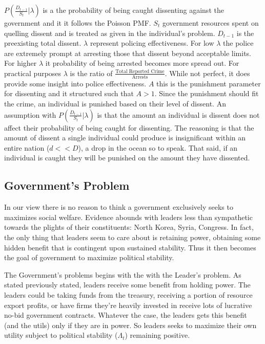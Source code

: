 \documentclass[12pt]{article}
\begin{document}
\begin{spacing}{1.5}
$P \left(\frac{D_{t-1}}{S_t}\Big|\lambda \right)$ is a the probability of being caught dissenting against the government and it it follows the Poisson PMF. $S_t$ government resources spent on quelling dissent and is treated as given in the individual's problem. $D_{t-1}$ is the preexisting total dissent. $\lambda$ represent policing effectiveness. For low $\lambda$ the police are extremely prompt at arresting those that dissent beyond acceptable limits. For higher $\lambda$ it probability of being arrested becomes more spread out. For practical purposes $\lambda$ is the ratio of $\frac{\text{Total Reported Crime}}{\text{Arrests}}$. While not perfect, it does provide some insight into police effectiveness. $A$ this is the punishment parameter for dissenting and it structured such that $A>1$. Since the punishment should fit the crime, an individual is punished based on their level of dissent. An assumption with $P \left(\frac{D_{t-1}}{S_t}\Big|\lambda \right)$ is that the amount an individual is dissent does not affect their probability of being caught for dissenting. The reasoning is that the amount of dissent a single individual could produce is insignificant within an entire nation ($d<<D$), a drop in the ocean so to speak. That said, if an individual is caught they will be punished on the amount they have dissented.   


\subsection{Government's Problem} 

In our view there is no reason to think a government exclusively seeks to maximizes social welfare. Evidence abounds with leaders less than sympathetic towards the plights of their constituents: North Korea, Syria, Congress. In fact, the only thing that leaders seem to care about is retaining power, obtaining some hidden benefit that is contingent upon sustained stability. Thus it then becomes the goal of government to maximize political stability. 

The Government's problems begins with the with the Leader's problem. As stated previously stated, leaders receive some benefit from holding power. The leaders could be taking funds from the treasury, receiving a portion of resource export profits, or have firms they're heavily invested in receive lots of lucrative no-bid government contracts. Whatever the case, the leaders gets this benefit (and the utils) only if they are in power. So leaders seeks to maximize their own utility subject to political stability ($\Lambda_t$) remaining positive.


\end{spacing}
\end{document}
